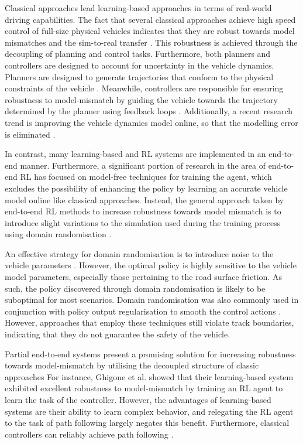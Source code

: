 Classical approaches lead learning-based approaches in terms of real-world driving capabilities.
The fact that several classical approaches achieve high speed control of full-size physical vehicles indicates that they are robust towards model mismatches and the sim-to-real transfer \cite{Stahl2019,Betz2019}.
This robustness is achieved through the decoupling of planning and control tasks. 
Furthermore, both planners and controllers are designed to account for uncertainty in the vehicle dynamics.
Planners are designed to generate trajectories that conform to the physical constraints of the vehicle \cite{Heilmeier2020, Kelly2010, Stahl2019}. 
Meanwhile, controllers are responsible for ensuring robustness to model-mismatch by guiding the vehicle towards the trajectory determined by the planner using feedback loops \cite{Coulter_1992, Becker2022, Hoffmann2007}.
Additionally, a recent research trend is improving the vehicle dynamics model online, so that the modelling error is eliminated \cite{Tatulea-Codrean2020, Brunner2018a}.

In contrast, many learning-based and RL systems are implemented in an end-to-end manner.
Furthermore, a significant portion of research in the area of end-to-end RL has focused on model-free techniques for training the agent, 
which excludes the possibility of enhancing the policy by learning an accurate vehicle model online like classical approaches.
Instead, the general approach taken by end-to-end RL methods to increase robustness towards model mismatch is to 
introduce slight variations to the simulation used during the training process using domain randomisation \cite{Ivanov2020, hsu2022, Chisari2021}.

An effective strategy for domain randomisation is to introduce noise to the vehicle parameters \cite{Chisari2021}. 
However, the optimal policy is highly sensitive to the vehicle model parameters, especially those pertaining to the road surface friction. 
As such, the policy discovered through domain randomisation is likely to be suboptimal for most scenarios.
Domain randomisation was also commonly used in conjunction with policy output regularisation to smooth the control actions \cite{hsu2022, Chisari2021}.
However, approaches that employ these techniques \cite{Ivanov2020, hsu2022, Chisari2021} still violate track boundaries, indicating that they do not guarantee the safety of the vehicle.

Partial end-to-end systems present a promising solution for increasing robustness towards model-mismatch by utilising the decoupled structure of classic approaches
For instance, Ghigone et al. \cite{Ghignone2022} showed that their learning-based system exhibited excellent robustness to model-mismatch by training an RL agent to learn the task of the controller. 
However, the advantages of learning-based systems are their ability to learn complex behavior, and relegating the RL agent to the task of path following largely negates this benefit. 
Furthermore, classical controllers can reliably achieve path following \cite{Coulter_1992, Becker2022, Hoffmann2007}.

